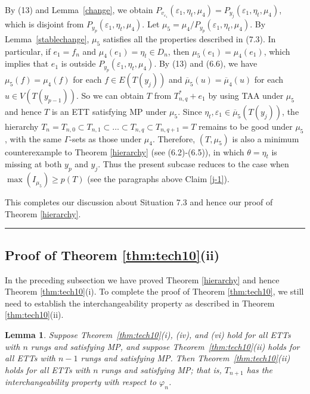 \documentclass[11pt]{article}
\newtheorem{lemma}[theorem]{Lemma}
\def\qed{\hfill \rule{4pt}{7pt}}
\begin{document}
By (13) and Lemma~\ref{change}, we obtain $P_{v_{\varepsilon_1}} (\varepsilon_1, \eta_t, \mu_4) = 
P_{y_j}(\varepsilon_1, \eta_t, \mu_4)$, which is disjoint from $P_{y_p}(\varepsilon_1, \eta_t, \mu_4)$.
Let $\mu_5=\mu_4/P_{y_p}(\varepsilon_1, \eta_t, \mu_4)$. By Lemma~\ref{stablechange},  $\mu_5$ satisfies all 
the properties described in (7.3). In particular, if $e_1=f_n$ and $\mu_4(e_1)=\eta_t  \in D_n$, then $\mu_5(e_1)=\mu_4(e_1)$, 
which implies that $e_1$ is outside $P_{y_p}(\varepsilon_1, \eta_t, \mu_4)$. By (13) and (6.6), we have $\mu_5(f)=\mu_4(f)$ 
for each $f\in E(T(y_j))$ and $\overline{\mu}_5(u)=\overline{\mu}_4(u)$ for each $u\in V(T(y_{p-1}))$.  So we can obtain 
$T$ from $T_{n,q}^*+e_1$ by using TAA under $\mu_5$ and hence $T$ is an ETT satisfying MP under $\mu_5$. Since $\eta_t, \varepsilon_1 \in
\overline{\mu}_5(T(y_j))$, the hierarchy $T_n=T_{n,0} \subset T_{n,1} \subset \ldots \subset 
T_{n,q} \subset T_{n,q+1}=T$ remains to be good under $\mu_5$, with the same $\Gamma$-sets as those under $\mu_4$. 
Therefore, $(T, \mu_5)$ is also a minimum counterexample to Theorem \ref{hierarchy} (see (6.2)-(6.5)), in which 
$\theta=\eta_t$ is missing at both $y_p$ and $y_j$. Thus the present subcase reduces to the case when $\max(I_{\mu_5}) 
\ge p(T)$ (see the paragraphs above Claim \ref{j-1}).

This completes our discussion about Situation 7.3 and hence our proof of Theorem \ref{hierarchy}. \qed

\subsection{Proof of Theorem \ref{thm:tech10}(ii)}

In the preceding subsection we have proved Theorem \ref{hierarchy} and hence Theorem \ref{thm:tech10}(i).
To complete the proof of Theorem \ref{thm:tech10}, we still need to establish the interchangeability property
as described in Theorem \ref{thm:tech10}(ii).

\begin{lemma}\label{rutgers}
Suppose Theorem~\ref{thm:tech10}(i), (iv), and (vi) hold for all ETTs with $n$ rungs and satisfying MP, and
suppose Theorem~\ref{thm:tech10}(ii) holds for all ETTs with $n-1$ rungs and satisfying MP. Then  
Theorem~\ref{thm:tech10}(ii) holds for all ETTs with $n$ rungs and satisfying MP; that is, 
$T_{n+1}$ has the interchangeability property with respect to $\varphi_n$.
\end{lemma}
\end{document}
